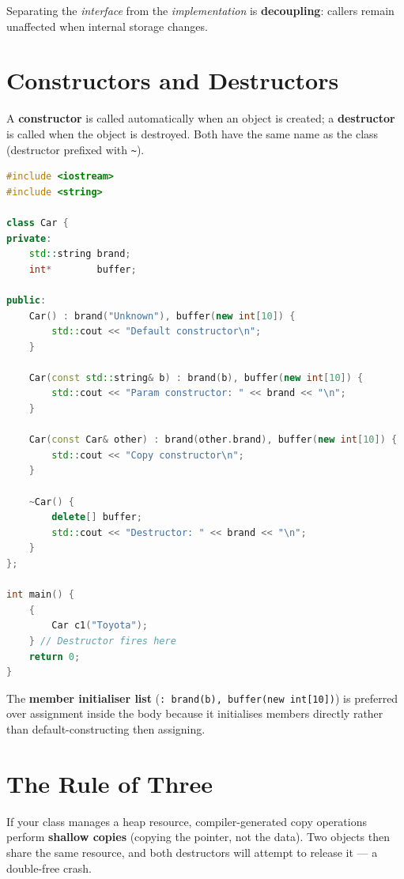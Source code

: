 Separating the \textit{interface} from the \textit{implementation} is \textbf{decoupling}: callers remain unaffected when internal storage changes.

\section{Constructors and Destructors}
\label{sec:constructors-destructors}

A \textbf{constructor} is called automatically when an object is created; a \textbf{destructor} is called when the object is destroyed. Both have the same name as the class (destructor prefixed with \texttt{\~}).

\begin{lstlisting}[language=C++, caption={Default, parameterised constructors and destructor}]
#include <iostream>
#include <string>

class Car {
private:
    std::string brand;
    int*        buffer;

public:
    Car() : brand("Unknown"), buffer(new int[10]) {
        std::cout << "Default constructor\n";
    }

    Car(const std::string& b) : brand(b), buffer(new int[10]) {
        std::cout << "Param constructor: " << brand << "\n";
    }

    Car(const Car& other) : brand(other.brand), buffer(new int[10]) {
        std::cout << "Copy constructor\n";
    }

    ~Car() {
        delete[] buffer;
        std::cout << "Destructor: " << brand << "\n";
    }
};

int main() {
    {
        Car c1("Toyota");
    } // Destructor fires here
    return 0;
}
\end{lstlisting}

The \textbf{member initialiser list} (\texttt{: brand(b), buffer(new int[10])}) is preferred over assignment inside the body because it initialises members directly rather than default-constructing then assigning.

\section{The Rule of Three}
\label{sec:rule-of-three}

If your class manages a heap resource, compiler-generated copy operations perform \textbf{shallow copies} (copying the pointer, not the data). Two objects then share the same resource, and both destructors will attempt to release it --- a double-free crash.

